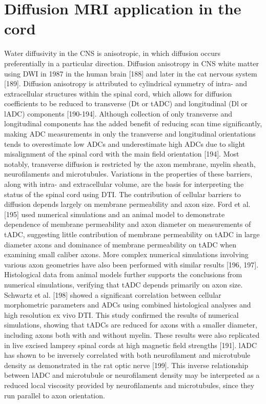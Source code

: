 \section{Diffusion MRI application in the cord}
Water diffusivity in the CNS is anisotropic, in which diffusion occurs preferentially in a particular direction. Diffusion anisotropy in CNS white matter using DWI in 1987 in the human brain [188] and later in the cat nervous system [189].  Diffusion anisotropy is attributed to cylindrical symmetry of intra- and extracellular structures within the spinal cord, which allows for diffusion coefficients to be reduced to transverse (Dt or tADC) and longitudinal (Dl or lADC) components [190-194].  Although collection of only transverse and longitudinal components has the added benefit of reducing scan time significantly, making ADC measurements in only the transverse and longitudinal orientations tends to overestimate low ADCs and underestimate high ADCs due to slight misalignment of the spinal cord with the main field orientation [194]. Most notably, transverse diffusion is restricted by the axon membrane, myelin sheath, neurofilaments and microtubules.  Variations in the properties of these barriers, along with intra- and extracellular volume, are the basis for interpreting the status of the spinal cord using DTI. 
The contribution of cellular barriers to diffusion depends largely on membrane permeability and axon size.  Ford et al. [195] used numerical simulations and an animal model to demonstrate dependence of membrane permeability and axon diameter on measurements of tADC, suggesting little contribution of membrane permeability on tADC in large diameter axons and dominance of membrane permeability on tADC when examining small caliber axons. More complex numerical simulations involving various axon geometries have also been performed with similar results [196, 197]. 
Histological data from animal models further supports the conclusions from numerical simulations, verifying that tADC depends primarily on axon size.  Schwartz et al. [198] showed a significant correlation between cellular morphometric parameters and ADCs using combined histological analyses and high resolution ex vivo DTI.  This study confirmed the results of numerical simulations, showing that tADCs are reduced for axons with a smaller diameter, including axons both with and without myelin.  These results were also replicated in live excised lamprey spinal cords at high magnetic field strengths [191]. lADC has shown to be inversely correlated with both neurofilament and microtubule density as demonstrated in the rat optic nerve [199].  This inverse relationship between lADC and microtubule or neurofilament density may be interpreted as a reduced local viscosity provided by neurofilaments and microtubules, since they run parallel to axon orientation. 
